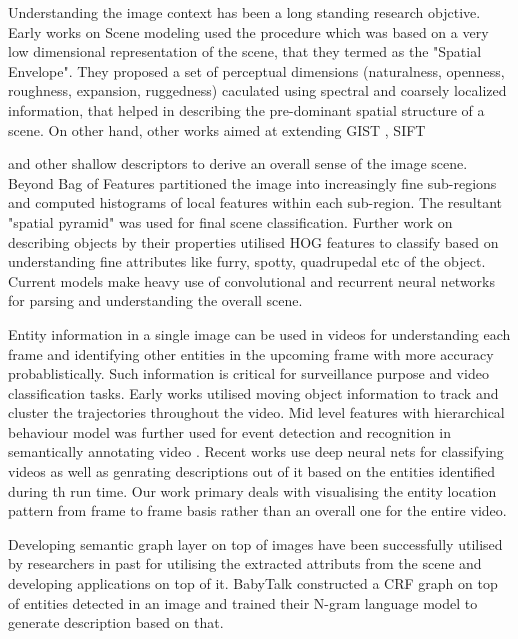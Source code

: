 \documentclass[conference]{IEEEtran}
\begin{document}
Understanding the image context has been a long standing research objctive. Early works on Scene modeling \cite{scene-modeling} used the procedure which was based on a very low dimensional representation of the scene, that they termed as the "Spatial Envelope". They proposed a set of perceptual dimensions (naturalness, openness, roughness, expansion, ruggedness) caculated using spectral and coarsely localized information, that helped in describing the pre-dominant spatial structure of a scene. On other hand, other works aimed at extending GIST \cite{gist}, SIFT{\cite{sift} and other shallow descriptors to derive an overall sense of the image scene.  Beyond Bag of Features \cite{beyondBOW} partitioned the image into increasingly fine sub-regions and computed histograms of local features within each sub-region. The resultant "spatial pyramid" was used for final scene classification. Further work on describing objects by their properties  \cite{image-description} utilised HOG \cite{HOG} features to classify based on understanding fine attributes like furry, spotty, quadrupedal etc of the object. Current models \cite{cnn} \cite{fcnn} \cite{scene-rcnn} \cite{scene-rnn} \cite{scene-lstm}  make heavy use of convolutional and recurrent neural networks for parsing and understanding the overall scene.

Entity information in a single image can be used in videos for understanding each frame and identifying other entities in the upcoming frame with more accuracy probablistically. Such information is critical for surveillance purpose and video classification tasks. Early works \cite{semantic-video-surveillance} utilised  moving object information to track and cluster the trajectories throughout the video.  Mid level features with hierarchical behaviour model was further used for event detection and recognition in semantically annotating video \cite{semantic-video-annotation}. Recent works \cite{video-cnn} \cite{video-to-text} use deep neural nets for classifying videos as well as genrating descriptions out of it based on the entities identified during th run time. Our work primary deals with visualising the entity location pattern from frame to frame basis rather than an overall one for the entire video.

Developing semantic graph layer on top of images have been successfully utilised by researchers in past for utilising the extracted attributs from the scene and developing applications on top of it. BabyTalk \cite{babytalk} constructed a CRF graph on top of entities detected in an image and trained their N-gram language model to generate description based on that. 

}
\end{document}
